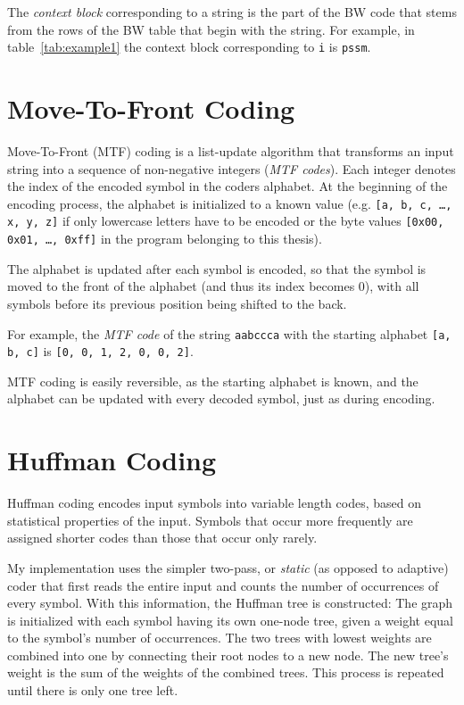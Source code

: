 \documentclass[a4paper]{scrreprt}
\begin{document}
The \emph{context block} corresponding to a string is the part of the BW code
that stems from the rows of the BW table that begin with the string. For
example, in table~\ref{tab:example1} the context block corresponding to
\texttt{i} is \texttt{pssm}.

\section{Move-To-Front Coding}

Move-To-Front (MTF) coding is a list-update algorithm that transforms an input
string into a sequence of non-negative integers (\emph{MTF codes}). Each integer
denotes the index of the encoded symbol in the coders alphabet. At the beginning
of the encoding process, the alphabet is initialized to a known value (e.g.
\texttt{[a, b, c, \ldots, x, y, z]} if only lowercase letters have to be
encoded or the byte values \texttt{[0x00, 0x01, \ldots, 0xff]} in the program
belonging to this thesis).

The alphabet is updated after each symbol is encoded, so that the symbol is
moved to the front of the alphabet (and thus its index becomes 0), with all
symbols before its previous position being shifted to the back.

For example, the \emph{MTF code} of the string \texttt{aabccca} with the
starting alphabet \texttt{[a, b, c]} is \texttt{[0, 0, 1, 2, 0, 0, 2]}.

MTF coding is easily reversible, as the starting alphabet is known, and the
alphabet can be updated with every decoded symbol, just as during encoding.

\section{Huffman Coding}

Huffman coding encodes input symbols into variable length codes, based on
statistical properties of the input. Symbols that occur more frequently are
assigned shorter codes than those that occur only rarely.

My implementation uses the simpler two-pass, or \emph{static} (as opposed
to adaptive) coder that first reads the entire input and counts the number of
occurrences of every symbol. With this information, the Huffman tree is
constructed: The graph is initialized with each symbol having its own one-node
tree, given a weight equal to the symbol's number of occurrences. The two trees
with lowest weights are combined into one by connecting their root nodes to a
new node. The new tree's weight is the sum of the weights of the combined trees.
This process is repeated until there is only one tree left.
\end{document}
